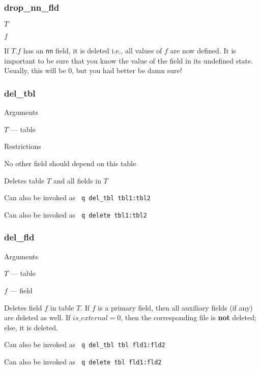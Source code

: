 \subsubsection{drop\_nn\_fld}
\label{drop_nn_fld}
\be
\item \(T\) 
\item \(f\)
\ee

If \(T.f\) has an {\tt nn} field, it is deleted i.e., all values of
\(f\) are now defined. It is important to be sure that you know the
value of the field in its undefined state. Usually, this will be 0, but
you had better be damn sure!


\subsubsection{del\_tbl}
\label{del_tbl}

Arguments
\be
\item \(T\) --- table
\ee

Restrictions
\be
\item No other field should depend on this table
\ee

Deletes table \(T\) and all fields in \(T\)

Can also be invoked as \verb+ q del_tbl tbl1:tbl2+

Can also be invoked as \verb+ q delete tbl1:tbl2+

\subsubsection{del\_fld}
\label{del_fld}

Arguments 
\be
\item \(T\) --- table
\item \(f\) --- field
\ee

Deletes field \(f\) in table \(T\). If \(f\) is a primary field, then
all auxiliary fields (if any) are deleted as well. If \(is\_external = 0\), then the corresponding file is {\bf not} deleted; else, it is deleted.

Can also be invoked as \verb+ q del_tbl tbl fld1:fld2+

Can also be invoked as \verb+ q delete tbl fld1:fld2+



